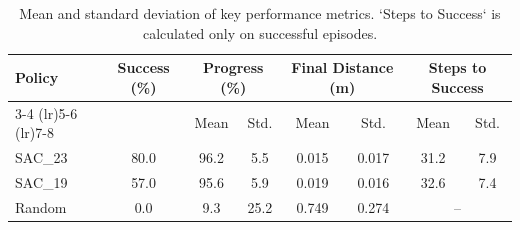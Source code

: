 \begin{table}[!htbp]
\caption{Mean and standard deviation of key performance metrics. `Steps to Success` is calculated only on successful episodes.}
\label{tab:performance_summary}
\begin{tabular}{l c cc cc cc}
\toprule
\textbf{Policy} & \textbf{Success (\%)} & \multicolumn{2}{c}{\textbf{Progress (\%)}} & \multicolumn{2}{c}{\textbf{Final Distance (m)}} & \multicolumn{2}{c}{\textbf{Steps to Success}} \\
\cmidrule(lr){3-4} \cmidrule(lr){5-6} \cmidrule(lr){7-8}
               &                       & Mean & Std. & Mean & Std. & Mean & Std. \\
\midrule
SAC_23 & 80.0 & 96.2 & 5.5 & 0.015 & 0.017 & 31.2 & 7.9 \\
SAC_19 & 57.0 & 95.6 & 5.9 & 0.019 & 0.016 & 32.6 & 7.4 \\
Random & 0.0 & 9.3 & 25.2 & 0.749 & 0.274 & \multicolumn{2}{c}{--} \\
\bottomrule
\end{tabular}
\end{table}